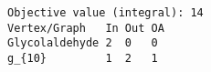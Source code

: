 \begin{verbatim}
Objective value (integral): 14
Vertex/Graph   In Out OA 
Glycolaldehyde 2  0   0  
g_{10}         1  2   1  
\end{verbatim}
